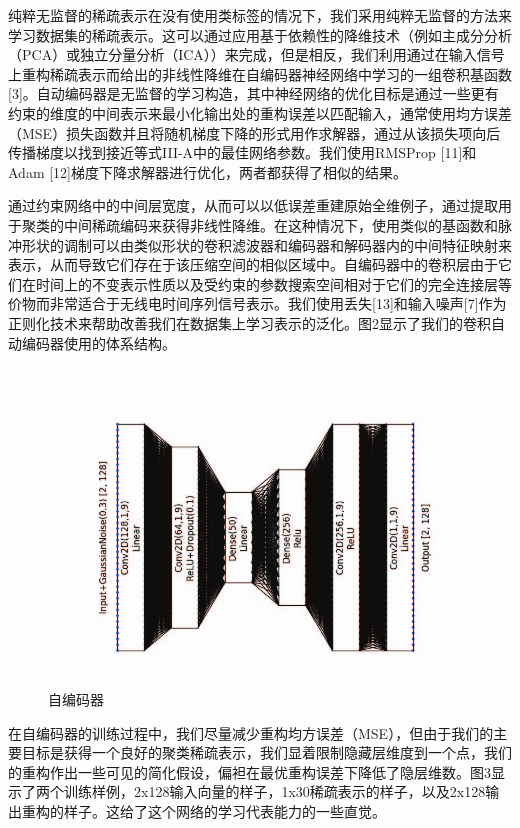 纯粹无监督的稀疏表示在没有使用类标签的情况下，我们采用纯粹无监督的方法来学习数据集的稀疏表示。这可以通过应用基于依赖性的降维技术（例如主成分分析（PCA）或独立分量分析（ICA））来完成，但是相反，我们利用通过在输入信号上重构稀疏表示而给出的非线性降维在自编码器神经网络中学习的一组卷积基函数[3]。自动编码器是无监督的学习构造，其中神经网络的优化目标是通过一些更有约束的维度的中间表示来最小化输出处的重构误差以匹配输入，通常使用均方误差（MSE）损失函数并且将随机梯度下降的形式用作求解器，通过从该损失项向后传播梯度以找到接近等式III-A中的最佳网络参数。我们使用RMSProp [11]和Adam [12]梯度下降求解器进行优化，两者都获得了相似的结果。\par

通过约束网络中的中间层宽度，从而可以以低误差重建原始全维例子，通过提取用于聚类的中间稀疏编码来获得非线性降维。在这种情况下，使用类似的基函数和脉冲形状的调制可以由类似形状的卷积滤波器和编码器和解码器内的中间特征映射来表示，从而导致它们存在于该压缩空间的相似区域中。自编码器中的卷积层由于它们在时间上的不变表示性质以及受约束的参数搜索空间相对于它们的完全连接层等价物而非常适合于无线电时间序列信号表示。我们使用丢失[13]和输入噪声[7]作为正则化技术来帮助改善我们在数据集上学习表示的泛化。图2显示了我们的卷积自动编码器使用的体系结构。\par

\begin{figure}[!h]
	\centering
	\includegraphics[scale=0.3]{figures/chapter_3/CAE}
	\caption{自编码器}	\label{fig_3_2}
\end{figure}

在自编码器的训练过程中，我们尽量减少重构均方误差（MSE），但由于我们的主要目标是获得一个良好的聚类稀疏表示，我们显着限制隐藏层维度到一个点，我们的重构作出一些可见的简化假设，偏袒在最优重构误差下降低了隐层维数。图3显示了两个训练样例，2x128输入向量的样子，1x30稀疏表示的样子，以及2x128输出重构的样子。这给了这个网络的学习代表能力的一些直觉。\par

